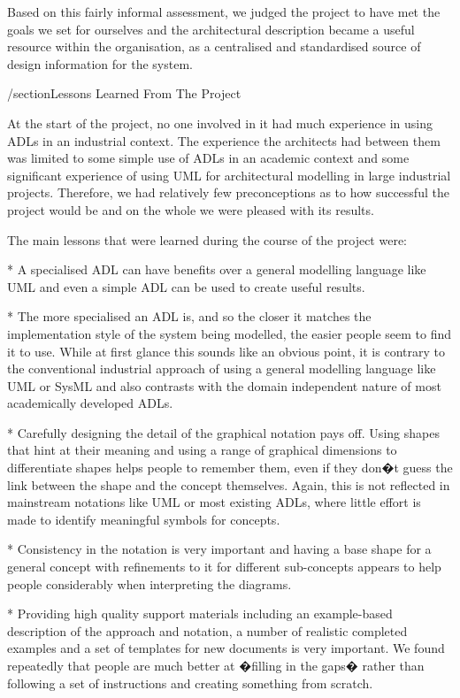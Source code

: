 \begin{itemise}
  Based on this fairly informal assessment, we judged the project to have met the goals we set for ourselves and the architectural description became a useful resource within the organisation, as a centralised and standardised source of design information for the system.

/section{Lessons Learned From The Project}

  At the start of the project, no one involved in it had much experience in using ADLs in an industrial context.  The experience the architects had between them was limited to some simple use of ADLs in an academic context and some significant experience of using UML for architectural modelling in large industrial projects.  Therefore, we had relatively few preconceptions as to how successful the project would be and on the whole we were pleased with its results.

  The main lessons that were learned during the course of the project were:

* A specialised ADL can have benefits over a general modelling language like UML and even a simple ADL can be used to create useful results.

* The more specialised an ADL is, and so the closer it matches the implementation style of the system being modelled, the easier people seem to find it to use.  While at first glance this sounds like an obvious point, it is contrary to the conventional industrial approach of using a general modelling language like UML or SysML and also contrasts with the domain independent nature of most academically developed ADLs.

* Carefully designing the detail of the graphical notation pays off.  Using shapes that hint at their meaning and using a range of graphical dimensions to differentiate shapes helps people to remember them, even if they don�t guess the link between the shape and the concept themselves.  Again, this is not reflected in mainstream notations like UML or most existing ADLs, where little effort is made to identify meaningful symbols for concepts.

* Consistency in the notation is very important and having a base shape for a general concept with refinements to it for different sub-concepts appears to help people considerably when interpreting the diagrams.

* Providing high quality support materials including an example-based description of the approach and notation, a number of realistic completed examples and a set of templates for new documents is very important.  We found repeatedly that people are much better at �filling in the gaps� rather than following a set of instructions and creating something from scratch.


\end{itemise}
